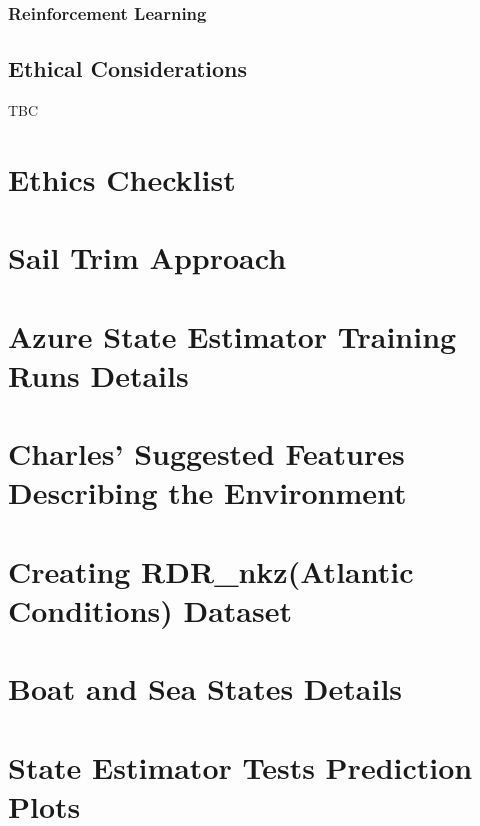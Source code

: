 \documentclass[12pt,twoside]{report}
\begin{document}
\subsection{Reinforcement Learning}

\section{Ethical Considerations}
TBC





\appendix
{}

\chapter{Ethics Checklist}
\label{app:ethics}


\chapter{Sail Trim Approach}


\chapter{Azure State Estimator Training Runs Details} 
\label{app:azure-runs}


\chapter{Charles' Suggested Features Describing the Environment}
\label{app:essential-features}


\chapter{Creating RDR\_nkz(Atlantic Conditions) Dataset}
\label{app:RDR}


\chapter{Boat and Sea States Details}
\label{app:states}


\chapter{State Estimator Tests Prediction Plots}
\label{app:prediction-plots}

\end{document}
